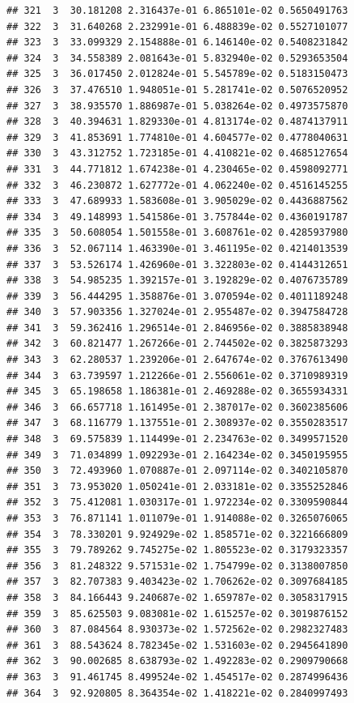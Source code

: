 \documentclass[article]{jss}\usepackage[]{graphicx}\usepackage[]{xcolor}
\makeatletter
\newenvironment{kframe}{%
 \def\at@end@of@kframe{}%
 \ifinner\ifhmode%
  \def\at@end@of@kframe{\end{minipage}}%
  \begin{minipage}{\columnwidth}%
 \fi\fi%
 \def\FrameCommand##1{\hskip\@totalleftmargin \hskip-\fboxsep
 \colorbox{shadecolor}{##1}\hskip-\fboxsep
     \hskip-\linewidth \hskip-\@totalleftmargin \hskip\columnwidth}%
 \MakeFramed {\advance\hsize-\width
   \@totalleftmargin\z@ \linewidth\hsize
   \@setminipage}}%
 {\par\unskip\endMakeFramed%
 \at@end@of@kframe}
\newenvironment{knitrout}{}{} %
\makeatother
\begin{document}
\begin{knitrout}
\begin{kframe}
\begin{verbatim}
## 321  3  30.181208 2.316437e-01 6.865101e-02 0.5650491763
## 322  3  31.640268 2.232991e-01 6.488839e-02 0.5527101077
## 323  3  33.099329 2.154888e-01 6.146140e-02 0.5408231842
## 324  3  34.558389 2.081643e-01 5.832940e-02 0.5293653504
## 325  3  36.017450 2.012824e-01 5.545789e-02 0.5183150473
## 326  3  37.476510 1.948051e-01 5.281741e-02 0.5076520952
## 327  3  38.935570 1.886987e-01 5.038264e-02 0.4973575870
## 328  3  40.394631 1.829330e-01 4.813174e-02 0.4874137911
## 329  3  41.853691 1.774810e-01 4.604577e-02 0.4778040631
## 330  3  43.312752 1.723185e-01 4.410821e-02 0.4685127654
## 331  3  44.771812 1.674238e-01 4.230465e-02 0.4598092771
## 332  3  46.230872 1.627772e-01 4.062240e-02 0.4516145255
## 333  3  47.689933 1.583608e-01 3.905029e-02 0.4436887562
## 334  3  49.148993 1.541586e-01 3.757844e-02 0.4360191787
## 335  3  50.608054 1.501558e-01 3.608761e-02 0.4285937980
## 336  3  52.067114 1.463390e-01 3.461195e-02 0.4214013539
## 337  3  53.526174 1.426960e-01 3.322803e-02 0.4144312651
## 338  3  54.985235 1.392157e-01 3.192829e-02 0.4076735789
## 339  3  56.444295 1.358876e-01 3.070594e-02 0.4011189248
## 340  3  57.903356 1.327024e-01 2.955487e-02 0.3947584728
## 341  3  59.362416 1.296514e-01 2.846956e-02 0.3885838948
## 342  3  60.821477 1.267266e-01 2.744502e-02 0.3825873293
## 343  3  62.280537 1.239206e-01 2.647674e-02 0.3767613490
## 344  3  63.739597 1.212266e-01 2.556061e-02 0.3710989319
## 345  3  65.198658 1.186381e-01 2.469288e-02 0.3655934331
## 346  3  66.657718 1.161495e-01 2.387017e-02 0.3602385606
## 347  3  68.116779 1.137551e-01 2.308937e-02 0.3550283517
## 348  3  69.575839 1.114499e-01 2.234763e-02 0.3499571520
## 349  3  71.034899 1.092293e-01 2.164234e-02 0.3450195955
## 350  3  72.493960 1.070887e-01 2.097114e-02 0.3402105870
## 351  3  73.953020 1.050241e-01 2.033181e-02 0.3355252846
## 352  3  75.412081 1.030317e-01 1.972234e-02 0.3309590844
## 353  3  76.871141 1.011079e-01 1.914088e-02 0.3265076065
## 354  3  78.330201 9.924929e-02 1.858571e-02 0.3221666809
## 355  3  79.789262 9.745275e-02 1.805523e-02 0.3179323357
## 356  3  81.248322 9.571531e-02 1.754799e-02 0.3138007850
## 357  3  82.707383 9.403423e-02 1.706262e-02 0.3097684185
## 358  3  84.166443 9.240687e-02 1.659787e-02 0.3058317915
## 359  3  85.625503 9.083081e-02 1.615257e-02 0.3019876152
## 360  3  87.084564 8.930373e-02 1.572562e-02 0.2982327483
## 361  3  88.543624 8.782345e-02 1.531603e-02 0.2945641890
## 362  3  90.002685 8.638793e-02 1.492283e-02 0.2909790668
## 363  3  91.461745 8.499524e-02 1.454517e-02 0.2874996436
## 364  3  92.920805 8.364354e-02 1.418221e-02 0.2840997493

\end{verbatim}
\end{kframe}
\end{knitrout}
\end{document}
